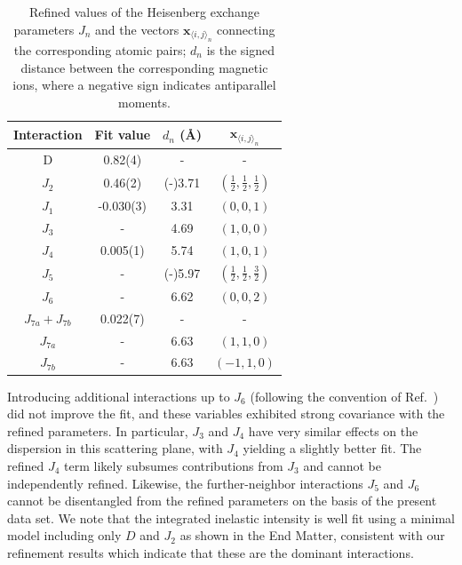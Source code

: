 \documentclass[aps, prl, twocolumn, superscriptaddress, longbibliography]{revtex4-2}
\begin{document}
\begin{table}
\caption{{
Refined values of the Heisenberg exchange parameters $J_n$ and the vectors $\bm{x}_{\langle i, j \rangle_n}$ connecting the corresponding atomic pairs; $d_n$ is the signed distance between the corresponding magnetic ions, where a negative sign indicates antiparallel moments. }}
\centering
\begin{ruledtabular}
\begin{tabular}{ c c c c  }
 Interaction & Fit value  & $d_n$ (\AA) & $\bm{x}_{\langle i, j \rangle_n}$ \\

\hline
D & 0.82(4) &  - & -  \\
 $J_2$ & 0.46(2) &(-)3.71 & $(\frac{1}{2},\frac{1}{2},\frac{1}{2})$ \\
 $J_1$ & -0.030(3) & 3.31 & $(0,0,1)$ \\
 $J_3$ & - & 4.69 & $(1,0,0)$ \\
 $J_4$ & 0.005(1) & 5.74 & $(1,0,1)$\\
 $J_5$ & - & (-)5.97 & $(\frac{1}{2},\frac{1}{2},\frac{3}{2})$  \\
 $J_6$ & - & 6.62 & $(0,0,2)$  \\
 $J_{7a} + J_{7b}$ & 0.022(7) & - & - \\
 $J_{7a}$ & - & 6.63 & $(1,1,0)$  \\
 $J_{7b}$ & - & 6.63 & $(-1,1,0)$  \\

\end{tabular}
\end{ruledtabular}
\label{table:Parameters}
\end{table}


Introducing additional interactions up to $J_6$ (following the convention of Ref.~\cite{faure2025_mnf2_neutron}) did not improve the fit, and these variables exhibited strong covariance with the refined parameters. In particular, $J_3$ and $J_4$ have very similar effects on the dispersion in this scattering plane, with $J_4$ yielding a slightly better fit. The refined $J_4$ term likely subsumes contributions from $J_3$ and cannot be independently refined. Likewise, the further-neighbor interactions $J_5$ and $J_6$ cannot be disentangled from the refined parameters on the basis of the present data set. We note that the integrated inelastic intensity is well fit using a minimal model including only $D$ and $J_2$ as shown in the End Matter, consistent with our refinement results which indicate that these are the dominant interactions.\\
\end{document}
